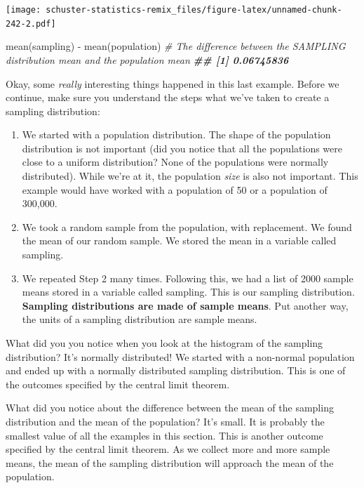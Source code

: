 \documentclass[
]{book}
\newenvironment{Shaded}{\begin{snugshade}}{\end{snugshade}}
\newcommand{\CommentTok}[1]{\textcolor[rgb]{0.56,0.35,0.01}{\textit{#1}}}
\newcommand{\DocumentationTok}[1]{\textcolor[rgb]{0.56,0.35,0.01}{\textbf{\textit{#1}}}}
\newcommand{\FunctionTok}[1]{\textcolor[rgb]{0.00,0.00,0.00}{#1}}
\newcommand{\NormalTok}[1]{#1}
\newcommand{\SpecialCharTok}[1]{\textcolor[rgb]{0.00,0.00,0.00}{#1}}
\providecommand{\tightlist}{%
  \setlength{\itemsep}{0pt}\setlength{\parskip}{0pt}}
\begin{document}
\texttt{[image: schuster-statistics-remix\_files/figure-latex/unnamed-chunk-242-2.pdf]}

\begin{Shaded}
\begin{Highlighting}[]
\FunctionTok{mean}\NormalTok{(sampling) }\SpecialCharTok{{-}} \FunctionTok{mean}\NormalTok{(population) }\CommentTok{\# The difference between the SAMPLING distribution mean and the population mean}
\DocumentationTok{\#\# [1] 0.06745836}
\end{Highlighting}
\end{Shaded}

Okay, some \emph{really} interesting things happened in this last example. Before we continue, make sure you understand the steps what we've taken to create a sampling distribution:

\begin{enumerate}
\def\labelenumi{\arabic{enumi}.}
\tightlist
\item
  We started with a population distribution. The shape of the population distribution is not important (did you notice that all the populations were close to a uniform distribution? None of the populations were normally distributed). While we're at it, the population \emph{size} is also not important. This example would have worked with a population of 50 or a population of 300,000.
\item
  We took a random sample from the population, with replacement. We found the mean of our random sample. We stored the mean in a variable called sampling.
\item
  We repeated Step 2 many times. Following this, we had a list of 2000 sample means stored in a variable called sampling. This is our sampling distribution. \textbf{Sampling distributions are made of sample means}. Put another way, the units of a sampling distribution are sample means.
\end{enumerate}

What did you you notice when you look at the histogram of the sampling distribution? It's normally distributed! We started with a non-normal population and ended up with a normally distributed sampling distribution. This is one of the outcomes specified by the central limit theorem.

What did you notice about the difference between the mean of the sampling distribution and the mean of the population? It's small. It is probably the smallest value of all the examples in this section. This is another outcome specified by the central limit theorem. As we collect more and more sample means, the mean of the sampling distribution will approach the mean of the population.
\end{document}
